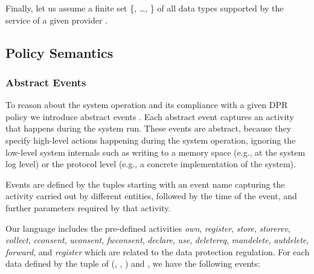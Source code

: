 \documentclass[a4paper]{article}
\begin{document}
Finally, let us assume a finite set \{, \dots, \} of all data types supported by the service of a given provider . 

\begin{figure}[htbp]
\centering
{}
\label{fig:polsp}
\end{figure}
   


\subsection{Policy Semantics}
\label{sec:semantic0} 

\subsubsection{Abstract Events}
\label{sec:aevents} 

To reason about the system operation and its compliance with a given DPR policy we introduce abstract events \cite{TaButin15}. Each abstract event captures an  activity that happens during the system run. These events are abstract, because they specify high-level actions happening during the system  operation, ignoring the low-level system internals such as writing to a memory space (e.g., at the system log level) or the protocol level (e.g., a concrete implementation of the system).
   
Events are defined by the tuples starting with an event name capturing the activity carried out by different entities, followed by the time of the event, and further parameters required by that activity.     

Our language includes the pre-defined activities \textit{own}, \textit{register}, \textit{store}, \textit{storerev}, \textit{collect},  \textit{cconsent}, \textit{uconsent}, \textit{fwconsent}, \textit{declare}, \textit{use}, \textit{deletereq}, \textit{mandelete}, \textit{autdelete}, \textit{forward}, and \textit{register} which are related to the data protection regulation. For each data  defined by the tuple of (, , ) and , we have the following events: 
\end{document}

